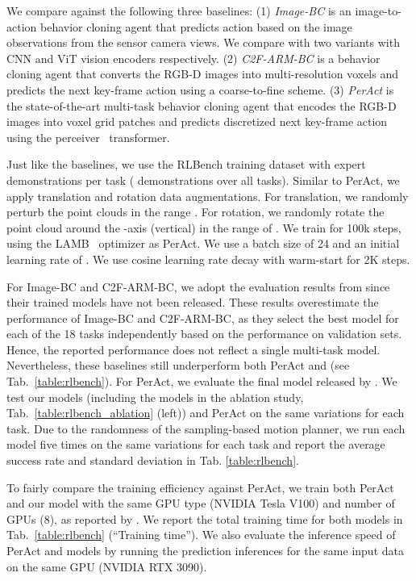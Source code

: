 We compare against the following three baselines: (1) \textit{Image-BC} \cite{jang2021bcz} is an image-to-action behavior cloning agent that predicts action based on the image observations from the sensor camera views. We compare with two variants with CNN and ViT vision encoders respectively. (2) \textit{C2F-ARM-BC} \cite{c2farm} is a behavior cloning agent that converts the RGB-D images into multi-resolution voxels and predicts the next key-frame action using a coarse-to-fine scheme. (3) \textit{PerAct} \cite{peract2022arxiv} is the state-of-the-art multi-task behavior cloning agent that encodes the RGB-D images into voxel grid patches and predicts discretized next key-frame action using the perceiver~\cite{jaegle2021perceiver} transformer.

Just like the baselines, we use the RLBench training dataset with  expert demonstrations per task ( demonstrations over all tasks). Similar to PerAct, we apply translation and rotation data augmentations. For translation, we randomly perturb the point clouds in the range . For rotation, we randomly rotate the point cloud around the -axis (vertical) in the range of . We train \method for 100k steps, using the LAMB~\cite{you2019large} optimizer as PerAct. We use a batch size of 24 and an initial learning rate of . We use cosine learning rate decay with warm-start for 2K steps.

For Image-BC and C2F-ARM-BC, we adopt the evaluation results from \cite{peract2022arxiv} since their trained models have not been released. These results overestimate the performance of Image-BC and C2F-ARM-BC, as they select the best model for each of the 18 tasks independently based on the performance on validation sets. Hence, the reported performance does not reflect a single multi-task model. Nevertheless, these baselines still underperform both PerAct and \method (see Tab.~\ref{table:rlbench}). For PerAct, we evaluate the final model released by \citet{peract2022arxiv}.  We test our models (including the models in the ablation study, Tab.~\ref{table:rlbench_ablation} (left)) and PerAct on the same  variations for each task. Due to the randomness of the sampling-based motion planner, we run each model five times on the same  variations for each task and report the average success rate and standard deviation in Tab. \ref{table:rlbench}.

To fairly compare the training efficiency against PerAct, we train both PerAct and our model with the same GPU type (NVIDIA Tesla V100) and number of GPUs (8), as reported by \citet{peract2022arxiv}. We report the total training time for both models in Tab.~\ref{table:rlbench} (``Training time''). We also evaluate the inference speed of PerAct and \method models by running the prediction inferences for the same input data on the same GPU (NVIDIA RTX 3090). 

